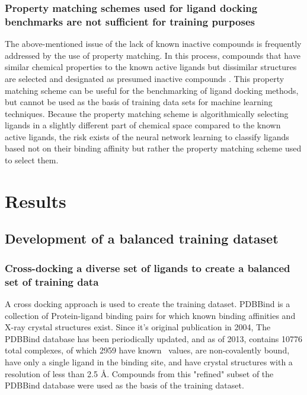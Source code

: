 \subsubsection{Property matching schemes used for ligand docking benchmarks are not sufficient for training purposes}
The above-mentioned issue of the lack of known inactive compounds is frequently addressed by the use of property matching.
In this process, compounds that have similar chemical properties to the known active ligands but dissimilar structures are selected and designated as presumed inactive compounds \citep{Huang:2006gi, Mysinger:2012hu, Bauer:2013de}.
This property matching scheme can be useful for the benchmarking of ligand docking methods, but cannot be used as the basis of training data sets for machine learning techniques.
Because the property matching scheme is algorithmically selecting ligands in a slightly different part of chemical space compared to the known active ligands, the risk exists of the neural network learning to classify ligands based not on their binding affinity but rather the property matching scheme used to select them.

\section{Results}

\subsection{Development of a balanced training dataset}
\label{subsec:dataset_description}

\subsubsection{Cross-docking a diverse set of ligands to create a balanced set of training data}
\label{subsubsec:pdbbind_overview}
A cross docking approach is used to create the training dataset.
PDBBind \citep{Wang:2004cm} is a collection of Protein-ligand binding pairs for which known binding affinities and X-ray crystal structures exist.
Since it's original publication in 2004, The PDBBind database has been periodically updated, and as of 2013, contains 10776 total complexes, of which 2959 have known \ki\ values, are non-covalently bound, have only a single ligand in the binding site,  and have crystal structures with a resolution of less than 2.5 \AA.
Compounds from this "refined" subset of the PDBBind database were used as the basis of the training dataset.

